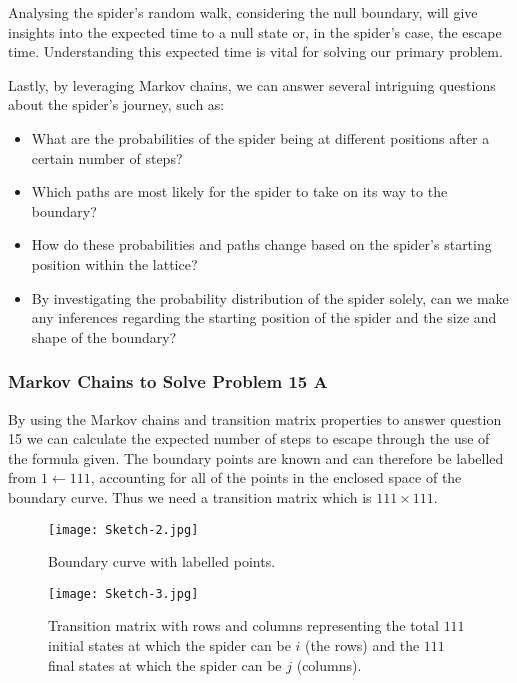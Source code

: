 \documentclass[12pt,a4paper]{article}
\begin{document}
Analysing the spider's random walk, considering the null boundary, will give insights into the expected time to a null state or, in the spider's case, the escape time. Understanding this expected time is vital for solving our primary problem.

Lastly, by leveraging Markov chains, we can answer several intriguing questions about the spider's journey, such as:
\begin{itemize}
    \item What are the probabilities of the spider being at different positions after a certain number of steps?
    \item Which paths are most likely for the spider to take on its way to the boundary?
    \item How do these probabilities and paths change based on the spider's starting position within the lattice?
    \item By investigating the probability distribution of the spider solely, can we make any inferences regarding the starting position of the spider and the size and shape of the boundary?
\end{itemize}

\subsubsection{Markov Chains to Solve Problem 15 A}

By using the Markov chains and transition matrix properties to answer question 15 we can calculate the expected number of steps to escape through the use of the formula given. The boundary points are known and can therefore be labelled from $1 \leftarrow 111$, accounting for all of the points in the enclosed space of the boundary curve. Thus we need a transition matrix which is $111 \times 111$. 

\begin{figure}[H]
  \centering
  \begin{minipage}[b]{0.45\textwidth}
    \texttt{[image: Sketch-2.jpg]}
    \caption{Boundary curve with labelled points.}
    \label{fig:poin1-1}
  \end{minipage}
  \hspace{0.05\textwidth}
  \begin{minipage}[b]{0.45\textwidth}
    \texttt{[image: Sketch-3.jpg]}
    \caption{Transition matrix with rows and columns representing the total $111$ initial states at which the spider can be $i$ (the rows) and the $111$ final states at which the spider can be $j$ (columns).}
    \label{fig:poin2-1}
  \end{minipage}
\end{figure}
\end{document}
